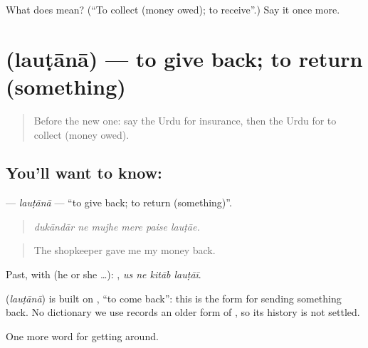 \begin{tcolorbox}[breakable,colback=teal!4,colframe=teal!35!black,title={Before you move on}]
What does   mean? (\textquotedblleft{}To collect (money owed); to receive\textquotedblright{}.) Say it once more.
\end{tcolorbox}
\section[\texorpdfstring{\ur{لوٹانا} (lauṭānā)}{لوٹانا (lauṭānā)}]{ (lauṭānā) — to give back; to return (something)}

\label{lesson:UR-C422-lautana}



\begin{quote}
Before the new one: say the Urdu for insurance, then the Urdu for to collect (money owed).
\end{quote}

\subsection*{You'll want to know: }
\textbf{} — \emph{lauṭānā} — \textquotedblleft{}to give back; to return (something)\textquotedblright{}.

\begin{quote}
     
\end{quote}

\begin{quote}
\emph{dukāndār ne mujhe mere paise lauṭāe.}
\end{quote}

\begin{quote}
The shopkeeper gave me my money back.
\end{quote}

Past, with  (he or she …):    , \emph{us ne kitāb lauṭāī}.

\begin{cousinweb}
\textbf{} (\emph{lauṭānā}) is built on \textbf{}, \textquotedblleft{}to come back\textquotedblright{}: this is the form for sending something back. No dictionary we use records an older form of \textbf{}, so its history is not settled.
\end{cousinweb}

\begin{grammarlens}[title={What you've built}]
One more word for getting around.
\end{grammarlens}

